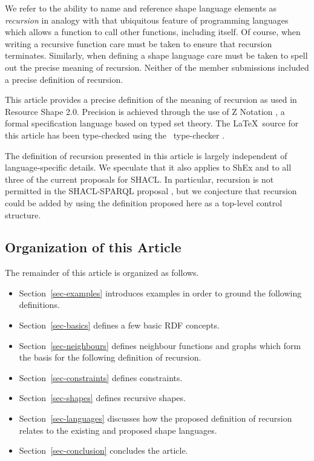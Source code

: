 \documentclass{article}
\begin{document}
We refer to the ability to name and reference shape language elements as {\em recursion} in analogy with that ubiquitous feature of programming languages which allows a function to call other functions, including itself.
Of course, when writing a recursive function care must be taken to ensure that recursion terminates.
Similarly, when defining a shape language care must be taken to spell out the precise meaning of recursion.
Neither of the member submissions included a precise definition of recursion.

This article provides a precise definition of the meaning of recursion as used in Resource Shape 2.0.
Precision is achieved through the use of Z Notation \cite{spivey:zrm}, a formal specification language based on
typed set theory.
The \LaTeX\ source for this article has been type-checked using the \fuzz\ type-checker \cite{spivey:fuzz}.

The definition of recursion presented in this article is largely independent of language-specific details.
We speculate that it also applies to ShEx and to all three of the current proposals for SHACL.
In particular, recursion is not permitted in the SHACL-SPARQL proposal \cite{peter:shacl}, but we conjecture
that recursion could be added by using the definition proposed here as a top-level control structure.

\subsection{Organization of this Article}
The remainder of this article is organized as follows.
\begin{itemize}
\item Section~\ref{sec-examples} introduces examples in order to ground the following definitions.
\item Section~\ref{sec-basics} defines a few basic RDF concepts.
\item Section~\ref{sec-neighbours} defines neighbour functions and graphs which form the basis for the following definition of recursion.
\item Section~\ref{sec-constraints} defines constraints.
\item Section~\ref{sec-shapes} defines recursive shapes.
\item Section~\ref{sec-languages} discusses how the proposed definition of recursion relates to the existing and proposed shape languages.
\item Section~\ref{sec-conclusion} concludes the article.
\end{itemize}
\end{document}
